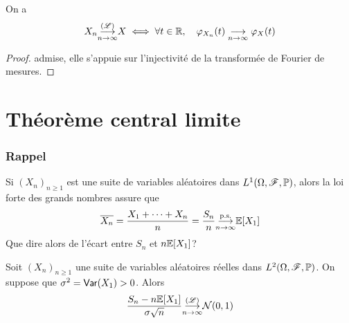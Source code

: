 \begin{theorem}[de Lévy]
    On a
    \begin{equation*}
        X_n\underset{n\to\infty}{{\overset{(\mathscr{L})}{\longrightarrow}}} X \iff \forall t\in\mathbb{R},\quad \varphi_{X_n}(t) \underset{n\to\infty}{\longrightarrow} \varphi_X(t)
    \end{equation*}
\end{theorem}

\begin{proof}
    admise, elle s'appuie sur l'injectivité de la transformée de Fourier
    de mesures.
\end{proof}

\section{Théorème central limite}

\subsubsection*{Rappel}
Si \({(X_n)}_{n\geq 1}\) est une suite de variables aléatoires \iid{}
dans \(L^1(\Omega,\mathscr{F},\mathbb{P})\), alors la loi forte des grands nombres
assure que
\begin{equation*}
    \overline{X_n} = \frac{X_1+\cdots+X_n}{n} =\frac{S_n}{n} \underset{n\to\infty}{{\overset{\text{p.s.}}{\longrightarrow}}} \mathbb{E}[X_1]
\end{equation*}
Que dire alors de l'écart entre \(S_n\) et \(n\mathbb{E}[X_1]\)?\\

\begin{theorem}
    Soit \({(X_n)}_{n\geq 1}\) une suite de variables aléatoires
    réelles \iid{} dans \(L^2(\Omega,\mathscr{F},\mathbb{P})\). On suppose que
    \(\sigma^2=\operatorname{\mathsf{Var}}(X_1)>0\). Alors
    \begin{equation*}
        \frac{S_n-n\mathbb{E}[X_1]}{\sigma\sqrt{n}} \underset{n\to\infty}{{\overset{(\mathscr{L})}{\longrightarrow}}} \mathcal N(0,1)
    \end{equation*}
\end{theorem}

